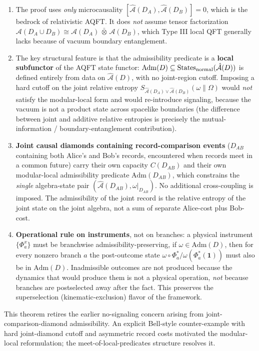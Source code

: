 \documentclass[11pt,a4paper]{article}
\begin{document}
\begin{enumerate}
  \item The proof uses \emph{only} microcausality $[\hat{\mathcal{A}}(D_A), \hat{\mathcal{A}}(D_B)] = 0$, which is the bedrock of relativistic AQFT. It does \emph{not} assume tensor factorization $\mathcal{A}(D_A \cup D_B) \cong \mathcal{A}(D_A) \,\bar\otimes\, \mathcal{A}(D_B)$, which Type III local QFT generally lacks because of vacuum boundary entanglement.
  \item The key structural feature is that the admissibility predicate is a \textbf{local subfunctor} of the AQFT state functor: $\mathrm{Adm}(D) \subseteq \mathrm{States}_{\rm normal}(\hat{\mathcal{A}}(D))$ is defined entirely from data on $\hat{\mathcal{A}}(D)$, with no joint-region cutoff. Imposing a hard cutoff on the joint relative entropy $S_{\hat{\mathcal{A}}(D_A) \vee \hat{\mathcal{A}}(D_B)}(\omega \| \Omega)$ would \emph{not} satisfy the modular-local form and would re-introduce signaling, because the vacuum is not a product state across spacelike boundaries (the difference between joint and additive relative entropies is precisely the mutual-information / boundary-entanglement contribution).
  \item \textbf{Joint causal diamonds containing record-comparison events} ($D_{AB}$ containing both Alice's and Bob's records, encountered when records meet in a common future) carry their own capacity $C(D_{AB})$ and their own modular-local admissibility predicate $\mathrm{Adm}(D_{AB})$, which constrains the \emph{single} algebra-state pair $(\hat{\mathcal{A}}(D_{AB}), \omega|_{D_{AB}})$. No additional cross-coupling is imposed. The admissibility of the joint record is the relative entropy of the joint state on the joint algebra, not a sum of separate Alice-cost plus Bob-cost.
  \item \textbf{Operational rule on instruments}, not on branches: a physical instrument $\{\Phi_a^x\}$ must be branchwise admissibility-preserving, if $\omega \in \mathrm{Adm}(D)$, then for every nonzero branch $a$ the post-outcome state $\omega \circ \Phi_a^* / \omega(\Phi_a^*(\mathbf{1}))$ must also be in $\mathrm{Adm}(D)$. Inadmissible outcomes are not produced because the dynamics that would produce them is not a physical operation, \emph{not} because branches are postselected away after the fact. This preserves the superselection (kinematic-exclusion) flavor of the framework.
\end{enumerate}

This theorem retires the earlier no-signaling concern arising from joint-comparison-diamond admissibility. An explicit Bell-style counter-example with hard joint-diamond cutoff and asymmetric record costs motivated the modular-local reformulation; the meet-of-local-predicates structure resolves it.
\end{document}
